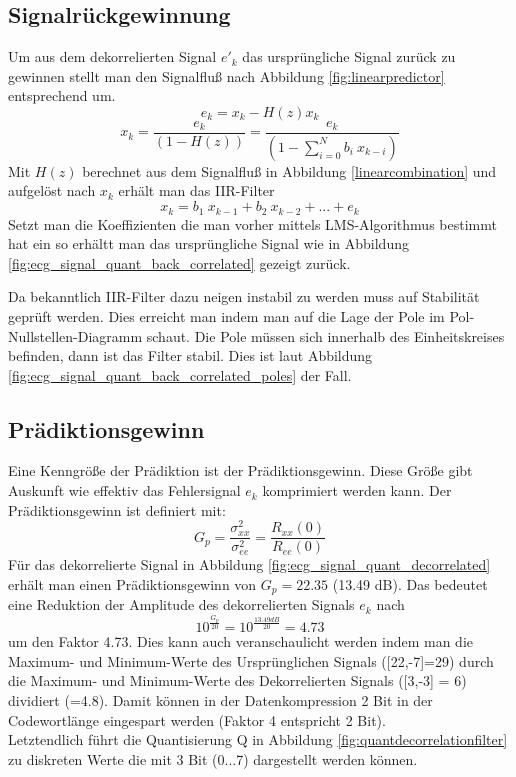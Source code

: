 \documentclass[
    10pt, %
    DIV12,
    english, %
    a5paper, %
    twoside, %
    titlepage, %
    parskip=half, %
    headings=small, %
    listof=totoc, %
    bibliography=totoc, %
    index=totoc, %
    captions=tableheading, %
    final %
]{scrbook}
\begin{document}
\subsection{Signalrückgewinnung}
Um aus dem dekorrelierten Signal $e'_k$ das ursprüngliche Signal zurück zu gewinnen stellt man den Signalfluß nach Abbildung \ref{fig:linearpredictor} entsprechend um.
\begin{equation}
e_k = x_k - H(z) x_k \nonumber
\end{equation}
\begin{equation}
x_k = \frac{e_k}{(1-H(z))} =  \frac{e_k}{(1-\sum\limits_{i=0}^{N} b_i\:x_{k-i})}\nonumber
\end{equation}
Mit $H(z)$ berechnet aus dem Signalfluß in Abbildung \eqref{linearcombination} und aufgelöst nach $x_k$ erhält man das IIR-Filter
\begin{equation}
x_k = b_1\:x_{k-1}+b_2\:x_{k-2}+...+e_k\nonumber
\end{equation}
Setzt man die Koeffizienten die man vorher mittels LMS-Algorithmus bestimmt hat ein so erhältt man das ursprüngliche Signal wie in Abbildung \ref{fig:ecg_signal_quant_back_correlated} gezeigt zurück.

Da bekanntlich IIR-Filter dazu neigen instabil zu werden muss auf Stabilität geprüft werden. Dies erreicht man indem man auf die Lage der Pole im Pol-Nullstellen-Diagramm schaut. Die Pole müssen sich innerhalb des Einheitskreises befinden, dann ist das Filter stabil. Dies ist laut Abbildung \ref{fig:ecg_signal_quant_back_correlated_poles} der Fall. 

\subsection{Prädiktionsgewinn}
Eine Kenngröße der Prädiktion ist der Prädiktionsgewinn. Diese Größe gibt Auskunft wie effektiv das Fehlersignal $e_k$ komprimiert werden kann. 
Der Prädiktionsgewinn ist definiert mit:
\begin{equation}
G_p = \frac{\sigma_{xx}^2}{\sigma_{ee}^2} = \frac{R_{xx}(0)}{R_{ee}(0)} \nonumber
\end{equation}
Für das dekorrelierte Signal in Abbildung \ref{fig:ecg_signal_quant_decorrelated} erhält man einen Prädiktionsgewinn von $G_p=22.35$ (13.49 dB). Das bedeutet eine Reduktion 
der Amplitude des dekorrelierten Signals $e_k$ nach
\[10^{\frac{G_p}{20}} = 10^{\frac{13.49 dB}{20}} = 4.73\]
um den Faktor 4.73. Dies kann auch veranschaulicht werden indem man die Maximum- und Minimum-Werte des Ursprünglichen Signals ([22,-7]=29) durch die Maximum- und Minimum-Werte des Dekorrelierten Signals ([3,-3] = 6) dividiert (=4.8). Damit können in der Datenkompression 2 Bit in der Codewortlänge eingespart werden (Faktor 4 entspricht 2 Bit).\\
Letztendlich führt die Quantisierung Q in Abbildung \ref{fig:quantdecorrelationfilter} zu diskreten Werte die mit 3 Bit (0...7) dargestellt werden können.
\end{document}
